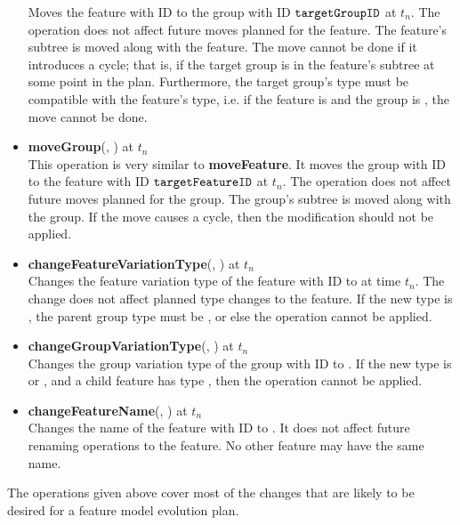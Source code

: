 \begin{itemize}
      Moves the feature with ID  to the group with ID $\texttt{targetGroupID}$ at $t_n$. The operation does not affect future moves planned for the feature. The feature's subtree is moved along with the feature. The move cannot be done if it introduces a cycle; that is, if the target group is in the feature's subtree at some point in the plan. Furthermore, the target group's type must be compatible with the feature's type, i.e. if the feature is \mandatory{} and the group is \optional{}, the move cannot be done.
  \item \textbf{moveGroup}(, ) at $t_n$ \\
    This operation is very similar to \textbf{moveFeature}. It moves the group with ID  to the feature with ID $\texttt{targetFeatureID}$ at $t_n$. The operation does not affect future moves planned for the group. The group's subtree is moved along with the group. If the move causes a cycle, then the modification should not be applied.
  \item \textbf{changeFeatureVariationType}(, ) at $t_n$ \\
    Changes the feature variation type of the feature with ID  to  at time $t_n$. The change does not affect planned type changes to the feature. If the new type is \mandatory{}, the parent group type must be \andtype{}, or else the operation cannot be applied.
  \item \textbf{changeGroupVariationType}(, ) at $t_n$\\
    Changes the group variation type of the group with ID  to . If the new type is \ortype{} or \xortype{}, and a child feature has type \mandatory{}, then the operation cannot be applied. 
  \item \textbf{changeFeatureName}(, ) at $t_n$\\
    Changes the name of the feature with ID  to . It does not affect future renaming operations to the feature. No other feature may have the same name.
\end{itemize}

The operations given above cover most of the changes that are likely to be desired for a feature model evolution plan.
